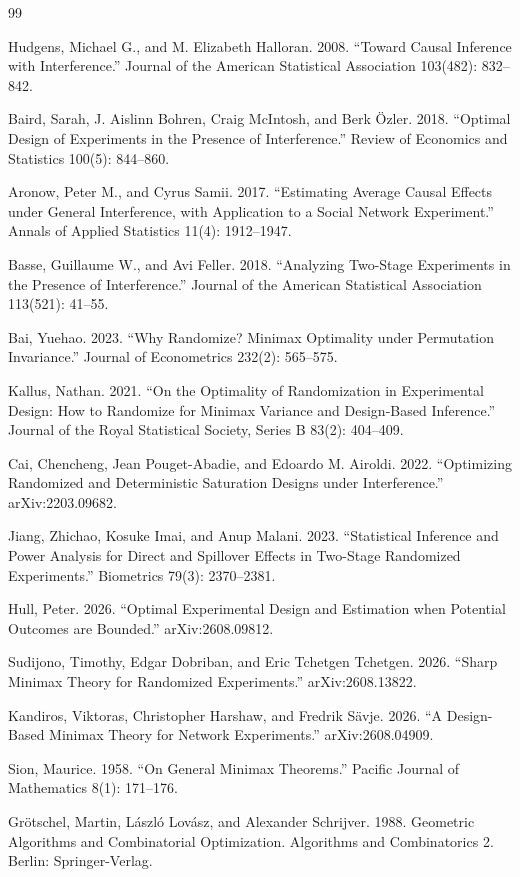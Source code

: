 \documentclass{article}
\begin{document}
\begin{thebibliography}{99}

   Hudgens, Michael G., and M. Elizabeth Halloran. 2008. ``Toward Causal Inference with Interference.'' Journal of the American Statistical Association 103(482): 832--842.

   Baird, Sarah, J. Aislinn Bohren, Craig McIntosh, and Berk Özler. 2018. ``Optimal Design of Experiments in the Presence of Interference.'' Review of Economics and Statistics 100(5): 844--860.

   Aronow, Peter M., and Cyrus Samii. 2017. ``Estimating Average Causal Effects under General Interference, with Application to a Social Network Experiment.'' Annals of Applied Statistics 11(4): 1912--1947.

   Basse, Guillaume W., and Avi Feller. 2018. ``Analyzing Two-Stage Experiments in the Presence of Interference.'' Journal of the American Statistical Association 113(521): 41--55.

   Bai, Yuehao. 2023. ``Why Randomize? Minimax Optimality under Permutation Invariance.'' Journal of Econometrics 232(2): 565--575.

   Kallus, Nathan. 2021. ``On the Optimality of Randomization in Experimental Design: How to Randomize for Minimax Variance and Design-Based Inference.'' Journal of the Royal Statistical Society, Series B 83(2): 404--409.

   Cai, Chencheng, Jean Pouget-Abadie, and Edoardo M. Airoldi. 2022. ``Optimizing Randomized and Deterministic Saturation Designs under Interference.'' arXiv:2203.09682.

   Jiang, Zhichao, Kosuke Imai, and Anup Malani. 2023. ``Statistical Inference and Power Analysis for Direct and Spillover Effects in Two-Stage Randomized Experiments.'' Biometrics 79(3): 2370--2381.

   Hull, Peter. 2026. ``Optimal Experimental Design and Estimation when Potential Outcomes are Bounded.'' arXiv:2608.09812.

   Sudijono, Timothy, Edgar Dobriban, and Eric Tchetgen Tchetgen. 2026. ``Sharp Minimax Theory for Randomized Experiments.'' arXiv:2608.13822.

   Kandiros, Viktoras, Christopher Harshaw, and Fredrik Sävje. 2026. ``A Design-Based Minimax Theory for Network Experiments.'' arXiv:2608.04909.

   Sion, Maurice. 1958. ``On General Minimax Theorems.'' Pacific Journal of Mathematics 8(1): 171--176.

   Grötschel, Martin, László Lovász, and Alexander Schrijver. 1988. Geometric Algorithms and Combinatorial Optimization. Algorithms and Combinatorics 2. Berlin: Springer-Verlag.

\end{thebibliography}
\end{document}

